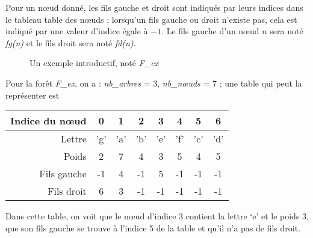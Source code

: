 Pour un nœud donné, les fils gauche et droit sont indiqués par leurs indices dans le tableau table des nœuds ; lorsqu’un fils gauche ou droit n’existe pas, cela est indiqué par une valeur d’indice égale à $-1$. Le fils gauche d’un nœud $n$ sera noté {\it fg(n)} et le fils droit sera noté {\it fd(n)}.
\begin{figure}[ht]
  \begin{center}
    \caption{Un exemple introductif, noté {\it F\_ex}}
  \end{center}
\end{figure}

\medskip
Pour la forêt  {\it F\_ex}, on a : {\it nb\_arbres} = 3, {\it nb\_nœuds} = 7 ; une table qui peut la représenter est
  \begin{center}
    \begin{tabular}{r|ccccccc}
     Indice du nœud  & 0&1&2&3&4&5&6\\
     \hline
     Lettre  & 'g'&'a'&'b'&'e'&'f'&'c'&'d'\\
     Poids & 2&7&4&3&5&4&5\\
     Fils gauche &-1&4&-1&5&-1&-1&-1\\
     Fils droit &6&3&-1&-1&-1&-1&-1\\
    \end{tabular}
  \end{center}
  Dans cette table, on voit que le nœud d’indice 3 contient la lettre ‘e’ et le poids 3, que son fils gauche se
trouve à l’indice 5 de la table et qu’il n’a pas de fils droit.

